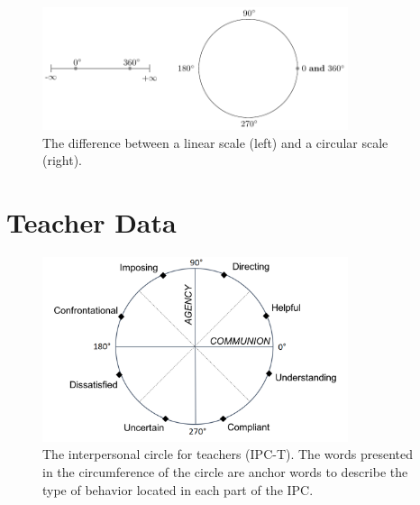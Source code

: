 \documentclass[man,mask]{apa6}
\begin{document}
\begin{figure}
\centering
\includegraphics[width = 0.8\textwidth]{Plots/circline.pdf}
\caption{The difference between a linear scale (left) and a circular scale (right).}
\label{circline}
\end{figure}

\vspace{-0.75cm}
\section{Teacher Data}\label{Example}
\vspace{-0.75cm}
\begin{figure}
\centering
\includegraphics[width = 0.8\textwidth]{Plots/IPC-T.png}
\caption{The interpersonal circle for teachers (IPC-T). The words presented in
the circumference of the circle are anchor words to describe the type of
behavior located in each part of the IPC.}
\label{QTI}
\end{figure}
\end{document}
